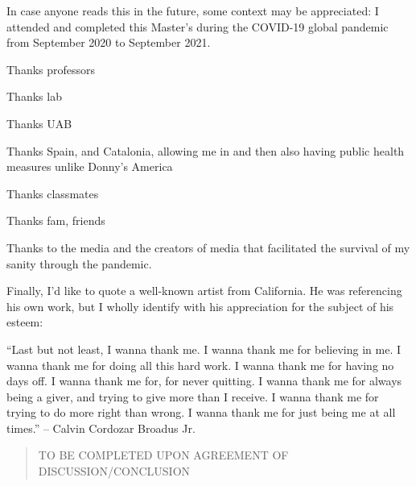 \documentclass[a4paper, nobind]{templates/ociamthesis}
\begin{document}

\begin{romanpages}

\maketitle


\begin{acknowledgements}
 	In case anyone reads this in the future, some context may be appreciated: I attended and completed this Master's during the COVID-19 global pandemic from September 2020 to September 2021.

  Thanks professors

  Thanks lab

  Thanks UAB

  Thanks Spain, and Catalonia, allowing me in and then also having public health measures unlike Donny's America

  Thanks classmates

  Thanks fam, friends

  Thanks to the media and the creators of media that facilitated the survival of my sanity through the pandemic.

  Finally, I'd like to quote a well-known artist from California. He was referencing his own work, but I wholly identify with his appreciation for the subject of his esteem:

  ``Last but not least, I wanna thank me. I wanna thank me for believing in me. I wanna thank me for doing all this hard work. I wanna thank me for having no days off. I wanna thank me for, for never quitting. I wanna thank me for always being a giver, and trying to give more than I receive. I wanna thank me for trying to do more right than wrong. I wanna thank me for just being me at all times.''
  -- Calvin Cordozar Broadus Jr.
\end{acknowledgements}


\begin{abstract}
	TO BE COMPLETED UPON AGREEMENT OF DISCUSSION/CONCLUSION


\end{abstract}
\end{romanpages}
\end{document}
